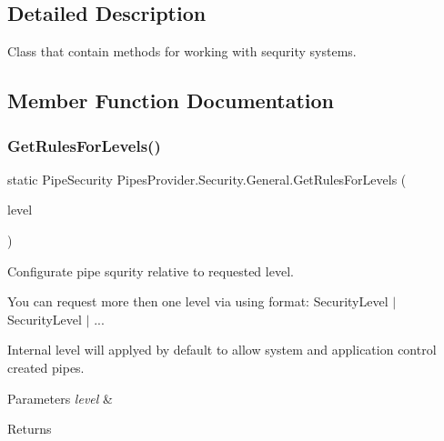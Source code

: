 \subsection{Detailed Description}
Class that contain methods for working with sequrity systems. 



\subsection{Member Function Documentation}
\mbox{\label{class_pipes_provider_1_1_security_1_1_general_a7b89c9d059851b68df31b78c1a2e021c}} 
\subsubsection{\texorpdfstring{Get\+Rules\+For\+Levels()}{GetRulesForLevels()}}
{\footnotesize\ttfamily static Pipe\+Security Pipes\+Provider.\+Security.\+General.\+Get\+Rules\+For\+Levels (\begin{DoxyParamCaption}\item[{\mbox{\hyperlink{namespace_pipes_provider_1_1_security_a1a6020eca1c661a6f7140e8260502d7e}{Security\+Level}}}]{level }\end{DoxyParamCaption})\hspace{0.3cm}{\ttfamily [static]}}



Configurate pipe squrity relative to requested level. 

You can request more then one level via using format\+: Security\+Level $\vert$ Security\+Level $\vert$ ...

Internal level will applyed by default to allow system and application control created pipes. 


\begin{DoxyParams}{Parameters}
{\em level} & \\
\hline
\end{DoxyParams}
\begin{DoxyReturn}{Returns}

\end{DoxyReturn}
\mbox{\label{class_pipes_provider_1_1_security_1_1_general_a9536a3073883f12e38979f54c6f389d1}} 
